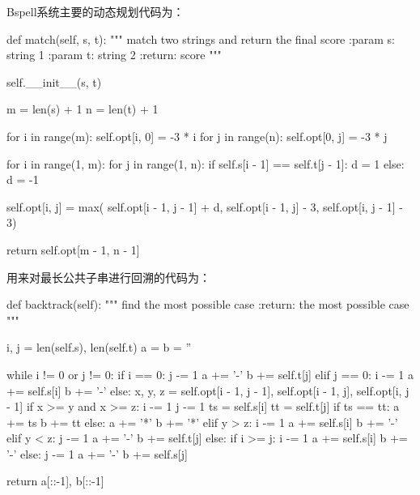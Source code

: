 \documentclass[UTF8,a4paper]{ctexart}
\begin{document}
\begin{itemize}
  Bspell系统主要的动态规划代码为：

  \begin{python}
def match(self, s, t):
    """
    match two strings and return the final score
    :param s: string 1
    :param t: string 2
    :return: score
    """
       
    self.__init__(s, t)

    m = len(s) + 1
    n = len(t) + 1

    for i in range(m):
        self.opt[i, 0] = -3 * i
    for j in range(n):
        self.opt[0, j] = -3 * j

    for i in range(1, m):
        for j in range(1, n):
            if self.s[i - 1] == self.t[j - 1]:
                d = 1
            else:
                d = -1

            self.opt[i, j] = max(
                self.opt[i - 1, j - 1] + d,
                self.opt[i - 1, j] - 3,
                self.opt[i, j - 1] - 3)

    return self.opt[m - 1, n - 1]
  \end{python}

  用来对最长公共子串进行回溯的代码为：

  \begin{python}
def backtrack(self):
    """
    find the most possible case
    :return: the most possible case
    """
    
    i, j = len(self.s), len(self.t)
    a = b = ''

    while i != 0 or j != 0:
        if i == 0:
            j -= 1
            a += '-'
            b += self.t[j]
        elif j == 0:
            i -= 1
            a += self.s[i]
            b += '-'
        else:
            x, y, z = self.opt[i - 1, j - 1], self.opt[i - 1, j], self.opt[i, j - 1]
            if x >= y and x >= z:
                i -= 1
                j -= 1
                ts = self.s[i]
                tt = self.t[j]
                if ts == tt:
                    a += ts
                    b += tt
                else:
                    a += '*'
                    b += '*'
            elif y > z:
                i -= 1
                a += self.s[i]
                b += '-'
            elif y < z:
                j -= 1
                a += '-'
                b += self.t[j]
            else:
                if i >= j:
                    i -= 1
                    a += self.s[i]
                    b += '-'
                else:
                    j -= 1
                    a += '-'
                    b += self.s[j]

    return a[::-1], b[::-1]
  \end{python}

\end{itemize}
\end{document}
